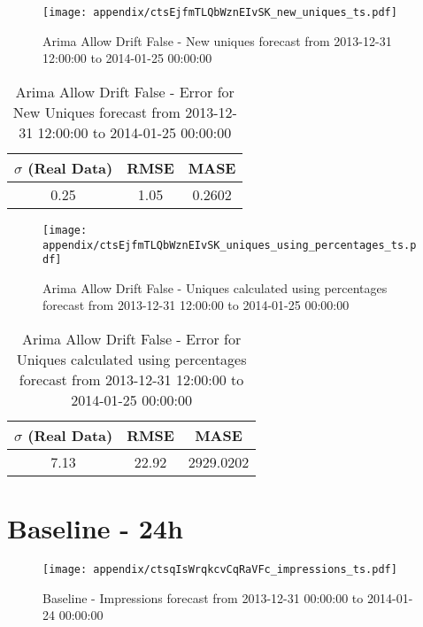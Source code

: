 \begin{figure}[H] \begin{center} \leavevmode
\texttt{[image: appendix/ctsEjfmTLQbWznEIvSK\_new\_uniques\_ts.pdf]} \caption{
Arima Allow Drift False - New uniques forecast from 2013-12-31 12:00:00 to 2014-01-25 00:00:00} \label{fig:appendix/ctsEjfmTLQbWznEIvSK_new_uniques_ts.pdf} \end{center}
\end{figure}

\begin{table}[H]
\centering
\footnotesize
\begin{tabular}{ccc}
$\sigma$ (Real Data) & RMSE & MASE   \\ \hline
0.25 & 1.05 & 0.2602 \\
\end{tabular}

\vspace{0.5cm}

\caption{
Arima Allow Drift False - Error for New Uniques forecast from 2013-12-31 12:00:00 to 2014-01-25 00:00:00}
\end{table}

\begin{figure}[H] \begin{center} \leavevmode
\texttt{[image: appendix/ctsEjfmTLQbWznEIvSK\_uniques\_using\_percentages\_ts.pdf]} \caption{
Arima Allow Drift False - Uniques calculated using percentages forecast from 2013-12-31 12:00:00 to 2014-01-25 00:00:00} \label{fig:appendix/ctsEjfmTLQbWznEIvSK_uniques_using_percentages_ts.pdf} \end{center}
\end{figure}

\begin{table}[H]
\centering
\footnotesize
\begin{tabular}{ccc}
$\sigma$ (Real Data) & RMSE & MASE   \\ \hline
7.13 & 22.92 & 2929.0202 \\
\end{tabular}

\vspace{0.5cm}

\caption{
Arima Allow Drift False - Error for Uniques calculated using percentages forecast from 2013-12-31 12:00:00 to 2014-01-25 00:00:00}
\end{table}

\section{Baseline - 24h}
\begin{figure}[H] \begin{center} \leavevmode
\texttt{[image: appendix/ctsqIsWrqkcvCqRaVFc\_impressions\_ts.pdf]} \caption{
Baseline - Impressions forecast from 2013-12-31 00:00:00 to 2014-01-24 00:00:00} \label{fig:appendix/ctsqIsWrqkcvCqRaVFc_impressions_ts.pdf} \end{center}
\end{figure}

